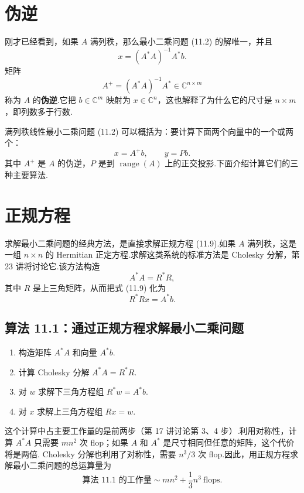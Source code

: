 \documentclass[UTF8,fontset=none,12pt]{ctexart}
\newcommand{\C}{\mathbb{C}}
\newcommand{\range}{\operatorname{range}}
\theoremstyle{definition}
\begin{document}
\section*{伪逆}

刚才已经看到，如果 $A$ 满列秩，那么最小二乘问题 (11.2) 的解唯一，并且
\[
    x=(A^*A)^{-1}A^*b.
\]
矩阵
\begin{equation}
    A^+=(A^*A)^{-1}A^*\in\C^{n\times m}
    \tag{11.11}
\end{equation}
称为 $A$ 的\textbf{伪逆}.它把 $b\in\C^m$ 映射为 $x\in\C^n$，这也解释了为什么它的尺寸是 $n\times m$，即列数多于行数.

满列秩线性最小二乘问题 (11.2) 可以概括为：要计算下面两个向量中的一个或两个：
\begin{equation}
    x=A^+b,\qquad y=Pb.
    \tag{11.12}
\end{equation}
其中 $A^+$ 是 $A$ 的伪逆，$P$ 是到 $\range(A)$ 上的正交投影.下面介绍计算它们的三种主要算法.

\section*{正规方程}

求解最小二乘问题的经典方法，是直接求解正规方程 (11.9).如果 $A$ 满列秩，这是一组 $n\times n$ 的 Hermitian 正定方程.求解这类系统的标准方法是 Cholesky 分解，第 23 讲将讨论它.该方法构造
\[
    A^*A=R^*R,
\]
其中 $R$ 是上三角矩阵，从而把式 (11.9) 化为
\begin{equation}
    R^*Rx=A^*b.
    \tag{11.13}
\end{equation}

\subsection*{算法 11.1：通过正规方程求解最小二乘问题}

\begin{enumerate}
    \item 构造矩阵 $A^*A$ 和向量 $A^*b$.
    \item 计算 Cholesky 分解 $A^*A=R^*R$.
    \item 对 $w$ 求解下三角方程组 $R^*w=A^*b$.
    \item 对 $x$ 求解上三角方程组 $Rx=w$.
\end{enumerate}

这个计算中占主要工作量的是前两步（第 17 讲讨论第 3、4 步）.利用对称性，计算 $A^*A$ 只需要 $mn^2$ 次 flop；如果 $A$ 和 $A^*$ 是尺寸相同但任意的矩阵，这个代价将是两倍. Cholesky 分解也利用了对称性，需要 $n^3/3$ 次 flop.因此，用正规方程求解最小二乘问题的总运算量为
\begin{equation}
    \text{算法 11.1 的工作量}\sim mn^2+\frac13n^3\ \text{flops}.
    \tag{11.14}
\end{equation}
\end{document}
